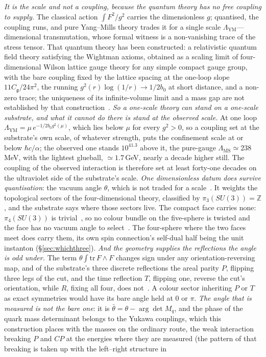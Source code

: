\documentclass[11pt]{article}
\begin{document}
\emph{It is the scale and not a coupling, because the quantum theory has no free coupling to supply.} The classical action $\int F^{2}/g^{2}$ carries the dimensionless $g$; quantised, the coupling runs, and pure Yang--Mills theory trades it for a single scale $\Lambda_{\mathrm{YM}}$---dimensional transmutation, whose formal witness is a non-vanishing trace of the stress tensor. That quantum theory has been constructed: a relativistic quantum field theory satisfying the Wightman axioms, obtained as a scaling limit of four-dimensional Wilson lattice gauge theory for any simple compact gauge group, with the bare coupling fixed by the lattice spacing at the one-loop slope $11C_{\mathfrak g}/24\pi^{2}$, the running $g^{2}(r)\log(1/r)\to1/2b_{0}$ at short distance, and a non-zero trace; the uniqueness of its infinite-volume limit and a mass gap are not established by that construction~\cite{YMGroup2026,JaffeWitten2000}. \emph{So a one-scale theory can stand on a one-scale substrate, and what it cannot do there is stand at the observed scale.} At one loop $\Lambda_{\mathrm{YM}}=\mu\,e^{-1/2b_{0}g^{2}(\mu)}$, which lies below $\mu$ for every $g^{2}>0$, so a coupling set at the substrate's own scale, of whatever strength, puts the confinement scale at or below $\hbar c/\alpha$; the observed one stands $10^{41.3}$ above it, the pure-gauge $\Lambda_{\overline{\mathrm{MS}}}\simeq238$\,MeV, with the lightest glueball, $\simeq1.7$\,GeV, nearly a decade higher still. The coupling of the observed interaction is therefore set at least forty-one decades on the ultraviolet side of the substrate's scale. \emph{One dimensionless datum does survive quantisation}: the vacuum angle $\theta$, which is not traded for a scale~\cite{CallanDashenGross1976,JackiwRebbiVacuum1976}. It weights the topological sectors of the four-dimensional theory, classified by $\pi_{3}(SU(3))=\mathbb{Z}$, and the substrate says where those sectors live. The compact face carries none: $\pi_{4}(SU(3))$ is trivial~\cite{Bott1959}, so no colour bundle on the five-sphere is twisted and the face has no vacuum angle to select~\cite{JanzenBoundary}. The four-sphere where the two faces meet does carry them, its own spin connection's self-dual half being the unit instanton (\S\ref{sec:whichthree}). \emph{And the geometry supplies the reflections the angle is odd under.} The term $\theta\int\mathrm{tr}\,F\wedge F$ changes sign under any orientation-reversing map, and of the substrate's three discrete reflections the areal parity $P$, flipping three legs of the cut, and the time reflection $T$, flipping one, reverse the cut's orientation, while $R$, fixing all four, does not~\cite{JanzenBoundary}. A colour sector inheriting $P$ or $T$ as exact symmetries would have its bare angle held at $0$ or $\pi$. \emph{The angle that is measured is not the bare one}: it is $\bar\theta=\theta-\arg\det M_{q}$, and the phase of the quark mass determinant belongs to the Yukawa couplings, which this construction places with the masses on the ordinary route, the weak interaction breaking $P$ and $CP$ at the energies where they are measured (the pattern of that breaking is taken up with the left--right structure in 
\end{document}
